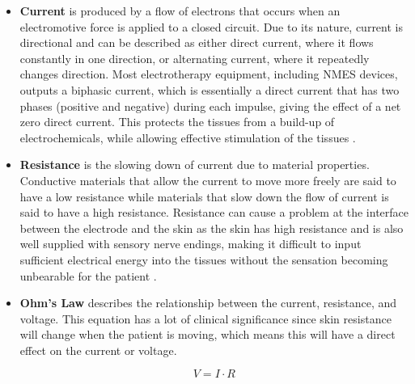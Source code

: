 \documentclass[11.5pt]{article}
\begin{document}
\begin{itemize}
    \item \textbf{Current} is produced by a flow of electrons that occurs when an electromotive force is applied to a closed circuit. Due to its nature, current is directional and can be described as either direct current, where it flows constantly in one direction, or alternating current, where it repeatedly changes direction. Most electrotherapy equipment, including NMES devices, outputs a biphasic current, which is essentially a direct current that has two phases (positive and negative) during each impulse, giving the effect of a net zero direct current. This protects the tissues from a build-up of electrochemicals, while allowing effective stimulation of the tissues \cite{Herbert}.
    \item \textbf{Resistance} is the slowing down of current due to material properties. Conductive materials that allow the current to move more freely are said to have a low resistance while materials that slow down the flow of current is said to have a high resistance. Resistance can cause a problem at the interface between the electrode and the skin as the skin has high resistance and is also well supplied with sensory nerve endings, making it difficult to input sufficient electrical energy into the tissues without the sensation becoming unbearable for the patient \cite{Herbert}. 
    \item \textbf{Ohm's Law} describes the relationship between the current, resistance, and voltage. This equation has a lot of clinical significance since skin resistance will change when the patient is moving, which means this will have a direct effect on the current or voltage.
    
    \begin{equation}
        V = I \cdot R
    \end{equation}
    

\end{itemize}
\end{document}
